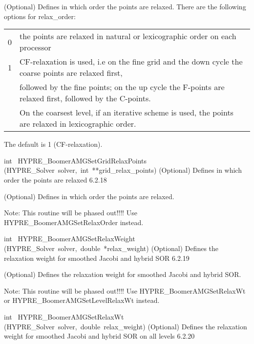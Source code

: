 \documentclass{article}
\begin{document}
\begin{cxxentry}
\begin{cxxentry}
\begin{cxxfunction}
\begin{cxxdoc}
(Optional) Defines in which order the points are relaxed. There are
the following options for
relax\_order: 

\begin{tabular}{|c|l|} \hline
0 & the points are relaxed in natural or lexicographic
order on each processor \\
1 &  CF-relaxation is used, i.e on the fine grid and the down
cycle the coarse points are relaxed first, \\
& followed by the fine points; on the up cycle the F-points are relaxed
first, followed by the C-points. \\
& On the coarsest level, if an iterative scheme is used, 
the points are relaxed in lexicographic order. \\
\hline
\end{tabular}

The default is 1 (CF-relaxation).
\end{cxxdoc}
\end{cxxfunction}
\begin{cxxfunction}
{int\ }
        {HYPRE\_BoomerAMGSetGridRelaxPoints}
        {(HYPRE\_Solver\ solver,\ int\ **grid\_relax\_points)}
        {
(Optional) Defines in which order the points are relaxed}
        {6.2.18}
\begin{cxxdoc}

(Optional) Defines in which order the points are relaxed. 

Note: This routine will be phased out!!!!
Use HYPRE\_BoomerAMGSetRelaxOrder instead.
\end{cxxdoc}
\end{cxxfunction}
\begin{cxxfunction}
{int\ }
        {HYPRE\_BoomerAMGSetRelaxWeight}
        {(HYPRE\_Solver\ solver,\ double\ *relax\_weight)}
        {
(Optional) Defines the relaxation weight for smoothed Jacobi and hybrid SOR}
        {6.2.19}
\begin{cxxdoc}

(Optional) Defines the relaxation weight for smoothed Jacobi and hybrid SOR.

Note: This routine will be phased out!!!!
Use HYPRE\_BoomerAMGSetRelaxWt or HYPRE\_BoomerAMGSetLevelRelaxWt instead.
\end{cxxdoc}
\end{cxxfunction}
\begin{cxxfunction}
{int\ }
        {HYPRE\_BoomerAMGSetRelaxWt}
        {(HYPRE\_Solver\ solver,\ double\ relax\_weight)}
        {
(Optional) Defines the relaxation weight for smoothed Jacobi and hybrid SOR 
on all levels}
        {6.2.20}
\begin{cxxdoc}


\end{cxxdoc}
\end{cxxfunction}
\end{cxxentry}
\end{cxxentry}
\end{document}
